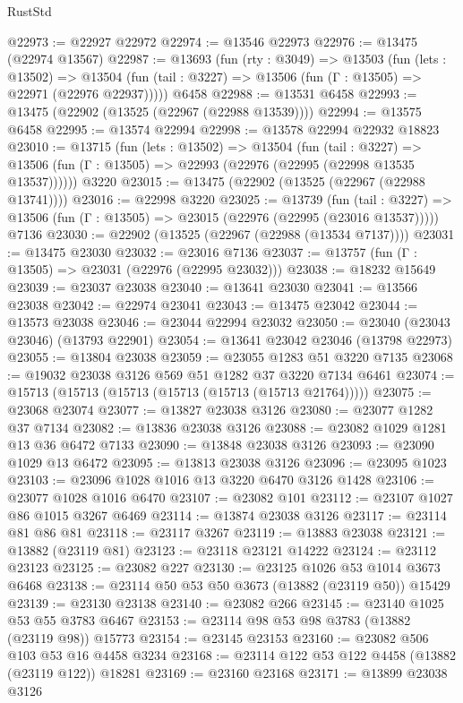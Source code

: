 \begin{lexlean}{RustStd}
\begin{coremodule}
@22973 := @22927 @22972
@22974 := @13546 @22973
@22976 := @13475 (@22974 @13567)
@22987 := @13693
    (fun (rty : @3049) =>
    @13503
      (fun (lets : @13502) =>
      @13504 (fun (tail : @3227) => @13506 (fun (Γ : @13505) => @22971 (@22976 @22937)))))
    @6458
@22988 := @13531 @6458
@22993 := @13475 (@22902 (@13525 (@22967 (@22988 @13539))))
@22994 := @13575 @6458
@22995 := @13574 @22994
@22998 := @13578 @22994 @22932 @18823
@23010 := @13715
    (fun (lets : @13502) =>
    @13504
      (fun (tail : @3227) =>
      @13506 (fun (Γ : @13505) => @22993 (@22976 (@22995 (@22998 @13535 @13537))))))
    @3220
@23015 := @13475 (@22902 (@13525 (@22967 (@22988 @13741))))
@23016 := @22998 @3220
@23025 := @13739
    (fun (tail : @3227) => @13506 (fun (Γ : @13505) => @23015 (@22976 (@22995 (@23016 @13537)))))
    @7136
@23030 := @22902 (@13525 (@22967 (@22988 (@13534 @7137))))
@23031 := @13475 @23030
@23032 := @23016 @7136
@23037 := @13757 (fun (Γ : @13505) => @23031 (@22976 (@22995 @23032)))
@23038 := @18232 @15649
@23039 := @23037 @23038
@23040 := @13641 @23030
@23041 := @13566 @23038
@23042 := @22974 @23041
@23043 := @13475 @23042
@23044 := @13573 @23038
@23046 := @23044 @22994 @23032
@23050 := @23040 (@23043 @23046) (@13793 @22901)
@23054 := @13641 @23042 @23046 (@13798 @22973)
@23055 := @13804 @23038
@23059 := @23055 @1283 @51 @3220 @7135
@23068 := @19032 @23038 @3126 @569 @51 @1282 @37 @3220 @7134 @6461
@23074 := @15713 (@15713 (@15713 (@15713 (@15713 (@15713 @21764)))))
@23075 := @23068 @23074
@23077 := @13827 @23038 @3126
@23080 := @23077 @1282 @37 @7134
@23082 := @13836 @23038 @3126
@23088 := @23082 @1029 @1281 @13 @36 @6472 @7133
@23090 := @13848 @23038 @3126
@23093 := @23090 @1029 @13 @6472
@23095 := @13813 @23038 @3126
@23096 := @23095 @1023
@23103 := @23096 @1028 @1016 @13 @3220 @6470 @3126 @1428
@23106 := @23077 @1028 @1016 @6470
@23107 := @23082 @101
@23112 := @23107 @1027 @86 @1015 @3267 @6469
@23114 := @13874 @23038 @3126
@23117 := @23114 @81 @86 @81
@23118 := @23117 @3267
@23119 := @13883 @23038
@23121 := @13882 (@23119 @81)
@23123 := @23118 @23121 @14222
@23124 := @23112 @23123
@23125 := @23082 @227
@23130 := @23125 @1026 @53 @1014 @3673 @6468
@23138 := @23114 @50 @53 @50 @3673 (@13882 (@23119 @50)) @15429
@23139 := @23130 @23138
@23140 := @23082 @266
@23145 := @23140 @1025 @53 @55 @3783 @6467
@23153 := @23114 @98 @53 @98 @3783 (@13882 (@23119 @98)) @15773
@23154 := @23145 @23153
@23160 := @23082 @506 @103 @53 @16 @4458 @3234
@23168 := @23114 @122 @53 @122 @4458 (@13882 (@23119 @122)) @18281
@23169 := @23160 @23168
@23171 := @13899 @23038 @3126

\end{coremodule}
\end{lexlean}
